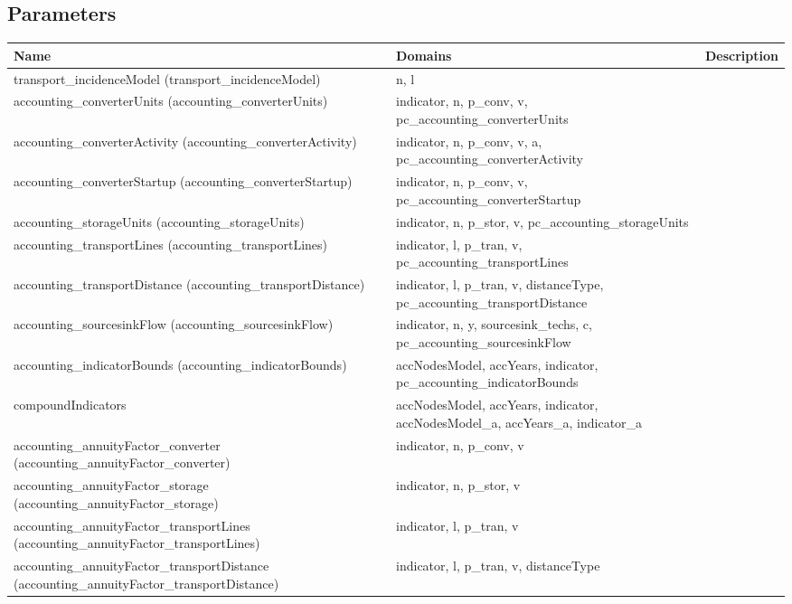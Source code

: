 \documentclass[11pt]{article}
\begin{document}
\subsection*{Parameters}
\begin{tabularx}{\textwidth}{| l | l | X |} 
\hline 
\textbf{Name} & \textbf{Domains} & \textbf{Description}\\ 
\hline 
\endhead 
transport\_incidenceModel (transport\_incidenceModel)  & n, l &  \\ 
accounting\_converterUnits (accounting\_converterUnits)  & indicator, n, p\_conv, v, pc\_accounting\_converterUnits &  \\ 
accounting\_converterActivity (accounting\_converterActivity)  & indicator, n, p\_conv, v, a, pc\_accounting\_converterActivity &  \\ 
accounting\_converterStartup (accounting\_converterStartup)  & indicator, n, p\_conv, v, pc\_accounting\_converterStartup &  \\ 
accounting\_storageUnits (accounting\_storageUnits)  & indicator, n, p\_stor, v, pc\_accounting\_storageUnits &  \\ 
accounting\_transportLines (accounting\_transportLines)  & indicator, l, p\_tran, v, pc\_accounting\_transportLines &  \\ 
accounting\_transportDistance (accounting\_transportDistance)  & indicator, l, p\_tran, v, distanceType, pc\_accounting\_transportDistance &  \\ 
accounting\_sourcesinkFlow (accounting\_sourcesinkFlow)  & indicator, n, y, sourcesink\_techs, c, pc\_accounting\_sourcesinkFlow &  \\ 
accounting\_indicatorBounds (accounting\_indicatorBounds)  & accNodesModel, accYears, indicator, pc\_accounting\_indicatorBounds &  \\ 
compoundIndicators & accNodesModel, accYears, indicator, accNodesModel\_a, accYears\_a, indicator\_a &  \\ 
accounting\_annuityFactor\_converter (accounting\_annuityFactor\_converter)  & indicator, n, p\_conv, v &  \\ 
accounting\_annuityFactor\_storage (accounting\_annuityFactor\_storage)  & indicator, n, p\_stor, v &  \\ 
accounting\_annuityFactor\_transportLines (accounting\_annuityFactor\_transportLines)  & indicator, l, p\_tran, v &  \\ 
accounting\_annuityFactor\_transportDistance (accounting\_annuityFactor\_transportDistance)  & indicator, l, p\_tran, v, distanceType &  \\ 

\end{tabularx}
\end{document}
